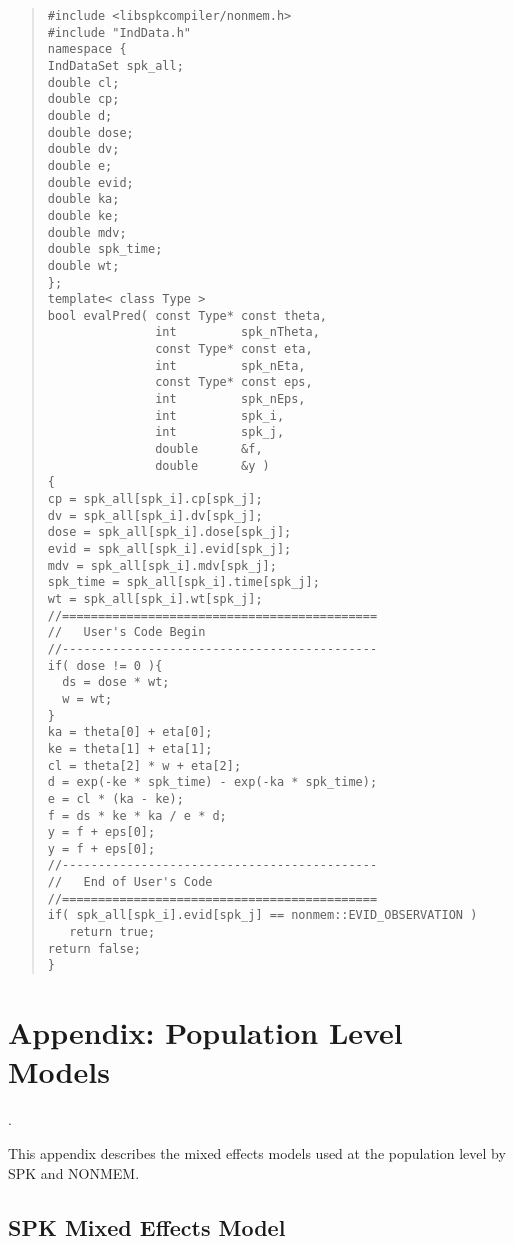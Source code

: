 \documentclass{article}
\begin{document}
\begin{quotation}
\noindent
\begin{verbatim}
#include <libspkcompiler/nonmem.h>
#include "IndData.h"
namespace {
IndDataSet spk_all;
double cl;
double cp;
double d;
double dose;
double dv;
double e;
double evid;
double ka;
double ke;
double mdv;
double spk_time;
double wt;
};
template< class Type >
bool evalPred( const Type* const theta, 
               int         spk_nTheta, 
               const Type* const eta, 
               int         spk_nEta, 
               const Type* const eps, 
               int         spk_nEps, 
               int         spk_i, 
               int         spk_j, 
               double      &f, 
               double      &y )
{
cp = spk_all[spk_i].cp[spk_j];
dv = spk_all[spk_i].dv[spk_j];
dose = spk_all[spk_i].dose[spk_j];
evid = spk_all[spk_i].evid[spk_j];
mdv = spk_all[spk_i].mdv[spk_j];
spk_time = spk_all[spk_i].time[spk_j];
wt = spk_all[spk_i].wt[spk_j];
//============================================
//   User's Code Begin
//--------------------------------------------
if( dose != 0 ){
  ds = dose * wt;
  w = wt;
}
ka = theta[0] + eta[0];
ke = theta[1] + eta[1];
cl = theta[2] * w + eta[2];
d = exp(-ke * spk_time) - exp(-ka * spk_time);
e = cl * (ka - ke);
f = ds * ke * ka / e * d;
y = f + eps[0];
y = f + eps[0];
//--------------------------------------------
//   End of User's Code
//============================================
if( spk_all[spk_i].evid[spk_j] == nonmem::EVID_OBSERVATION )
   return true;
return false;
}
\end{verbatim}
\end{quotation}

\newpage


%
\section{Appendix: Population Level Models}
%

\label{App:PopLevelModels}.

This appendix describes the mixed effects models used at the
population level by SPK and NONMEM. 


\subsection{SPK Mixed Effects Model}
\end{document}
